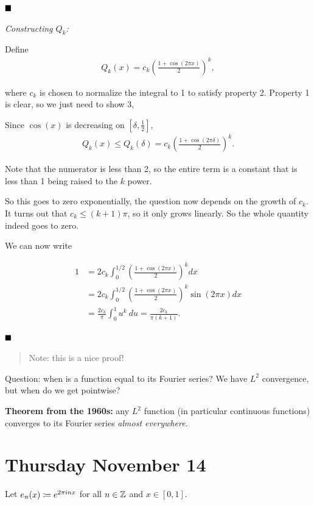 \(\qed\)

\emph{Constructing \(Q_k\):}

Define
\begin{align*}
Q_k(x) = c_k \left( \frac {1 + \cos(2\pi x)}{2} \right)^k,
\end{align*}

where \(c_k\) is chosen to normalize the integral to 1 to satisfy
property 2. Property 1 is clear, so we just need to show 3,

Since \(\cos(x)\) is decreasing on \([\delta, \frac 1 2]\),
\begin{align*}
Q_k(x) \leq Q_k(\delta) = c_k \left( \frac{1 + \cos(2\pi \delta)}{2} \right)^k
.\end{align*}

Note that the numerator is less than 2, so the entire term is a constant
that is less than 1 being raised to the \(k\) power.

So this goes to zero exponentially, the question now depends on the
growth of \(c_k\). It turns out that \(c_k \leq (k+1)\pi\), so it only
grows linearly. So the whole quantity indeed goes to zero.

We can now write

\begin{align*}
1 &= 2c_k \int_0^{1/2} \left( \frac{1 + \cos(2\pi x)}{2} \right)^k dx \\
&= 2c_k \int_0^{1/2} \left( \frac{1 + \cos(2\pi x)}{2} \right)^k \sin(2\pi x) dx \\
&= \frac{2c_k}{\pi} 
\int_0^1 u^k ~du 
= 
\frac{2c_k}{\pi(k+1)}
.\end{align*}

\(\qed\)

\begin{quote}
Note: this is a nice proof!
\end{quote}

Question: when is a function equal to its Fourier series? We have
\(L^2\) convergence, but when do we get pointwise?

\textbf{Theorem from the 1960s:} any \(L^2\) function (in particular
continuous functions) converges to its Fourier series \emph{almost
everywhere}.

\hypertarget{thursday-november-14}{%
\section{Thursday November 14}\label{thursday-november-14}}

Let \(e_n(x) \coloneqq e^{2\pi i n x}\) for all \(n\in {\mathbb{Z}}\) and
\(x\in [0,1]\).

